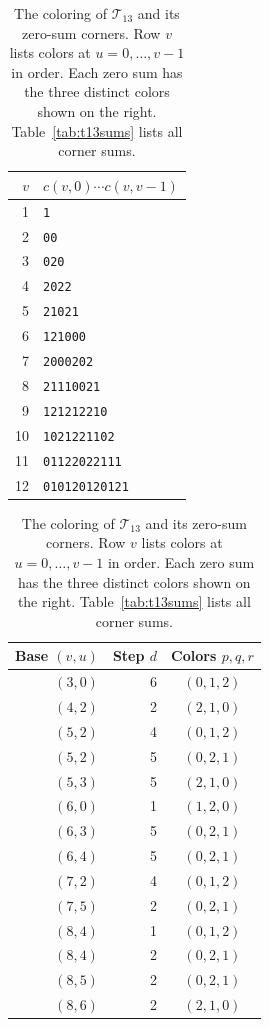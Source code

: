 \documentclass[11pt,a4paper]{article}
\newif\ifshowrevisions
\newcommand{\rev}[1]{{\ifshowrevisions\color{red}\fi #1}}
\theoremstyle{definition}
\newcommand{\Ttri}{\mathcal T}
\numberwithin{equation}{section}
\begin{document}
	\begin{table}[htbp]
		\centering
		\caption{The coloring of $\Ttri_{13}$ and its zero-sum corners. Row $v$ lists colors at $u=0,\ldots,v-1$ in order. Each zero sum has the three distinct colors shown on the right. \rev{Table~\ref{tab:t13sums} lists all corner sums.}}\label{tab:t13literal}
		\begin{tabular}{@{}rl@{}}
			\toprule $v$&$c(v,0)\cdots c(v,v-1)$\\\midrule
			1 & \texttt{1} \\
			2 & \texttt{00} \\
			3 & \texttt{020} \\
			4 & \texttt{2022} \\
			5 & \texttt{21021} \\
			6 & \texttt{121000} \\
			7 & \texttt{2000202} \\
			8 & \texttt{21110021} \\
			9 & \texttt{121212210} \\
			10 & \texttt{1021221102} \\
			11 & \texttt{01122022111} \\
			12 & \texttt{010120120121} \\
			\bottomrule\end{tabular}\qquad
		\begin{tabular}{@{}rrc@{}}
			\toprule Base $(v,u)$&Step $d$&Colors $p,q,r$\\\midrule
			$(3,0)$ & 6 & $(0,1,2)$ \\
			$(4,2)$ & 2 & $(2,1,0)$ \\
			$(5,2)$ & 4 & $(0,1,2)$ \\
			$(5,2)$ & 5 & $(0,2,1)$ \\
			$(5,3)$ & 5 & $(2,1,0)$ \\
			$(6,0)$ & 1 & $(1,2,0)$ \\
			$(6,3)$ & 5 & $(0,2,1)$ \\
			$(6,4)$ & 5 & $(0,2,1)$ \\
			$(7,2)$ & 4 & $(0,1,2)$ \\
			$(7,5)$ & 2 & $(0,2,1)$ \\
			$(8,4)$ & 1 & $(0,1,2)$ \\
			$(8,4)$ & 2 & $(0,2,1)$ \\
			$(8,5)$ & 2 & $(0,2,1)$ \\
			$(8,6)$ & 2 & $(2,1,0)$ \\
			\bottomrule\end{tabular}\end{table}
	
\end{document}
